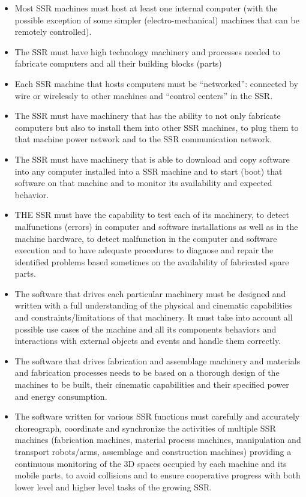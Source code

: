 \documentclass[letterpaper]{article}
\begin{document}
\bigskip

\begin{itemize}
\item Most SSR machines must host at least one internal computer (with
the possible exception of some simpler (electro-mechanical) machines
that can be remotely controlled).
\item The SSR must have high technology machinery and processes needed
to fabricate computers and all their building blocks (parts)
\item Each SSR machine that hosts computers must be “networked”:
connected by wire or wirelessly to other machines and “control centers”
in the SSR.
\item The SSR must have machinery that has the ability to not only
fabricate computers but also to install them into other SSR machines,
to plug them to that machine power network and to the SSR communication
network.
\item The SSR must have machinery that is able to download and copy
software into any computer installed into a SSR machine and to start
(boot) that software on that machine and to monitor its availability
and expected behavior.
\item THE SSR must have the capability to test each of its machinery, to
detect malfunctions (errors) in computer and software installations as
well as in the machine hardware, to detect malfunction in the computer
and software execution and to have adequate procedures to diagnose and
repair the identified problems based sometimes on the availability of
fabricated spare parts.
\item The software that drives each particular machinery must be
designed and written with a full understanding of the physical and
cinematic capabilities and constraints/limitations of that machinery.
It must take into account all possible use cases of the machine and all
its components behaviors and interactions with external objects and
events and handle them correctly.
\item The software that drives fabrication and assemblage machinery and
materials and fabrication processes needs to be based on a thorough
design of the machines to be built, their cinematic capabilities and
their specified power and energy consumption.
\item The software written for various SSR functions must carefully and
accurately choreograph, coordinate and synchronize the activities of
multiple SSR machines (fabrication machines, material process machines,
manipulation and transport robots/arms, assemblage and construction
machines) providing a continuous monitoring of the 3D spaces occupied
by each machine and its mobile parts, to avoid collisions and to ensure
cooperative progress with both lower level and higher level tasks of
the growing SSR.
\end{itemize}
\end{document}
